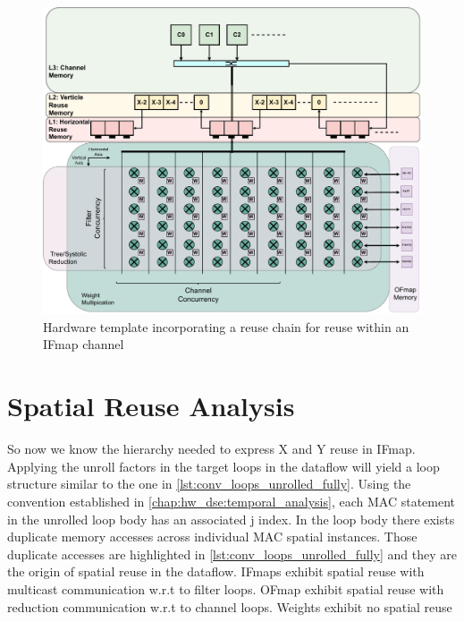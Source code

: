 \begin{figure}[]
    \centering
    \includegraphics[scale=0.4]{fig/reuse_chain.pdf}
    \caption{Hardware template incorporating a reuse chain for reuse within an IFmap channel }
    \label{fig:reuse_chain}
\end{figure}


\section{Spatial Reuse Analysis}
\label{chap:hw_dse:spatial_reuse_analysis}

So now we know the hierarchy needed to express X and Y reuse in IFmap. Applying
the unroll factors in the target loops in the dataflow will yield a loop
structure similar to the one in \ref{lst:conv_loops_unrolled_fully}. Using the
convention established in \ref{chap:hw_dse:temporal_analysis}, each
\ac{MAC} statement in the unrolled loop body has an associated j index. In the
loop body there exists duplicate memory accesses across individual \ac{MAC}
spatial instances. Those duplicate accesses are highlighted in
\autoref{lst:conv_loops_unrolled_fully} and they are the origin of spatial reuse
in the dataflow. IFmaps exhibit spatial reuse with multicast communication w.r.t
to filter loops. OFmap exhibit spatial reuse with reduction communication
w.r.t to channel loops. Weights exhibit no spatial reuse 
 
